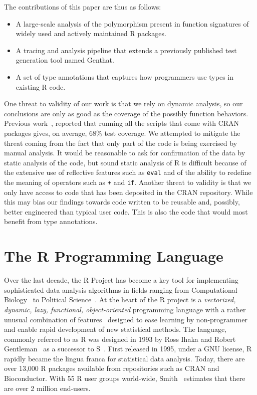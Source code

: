 \documentclass[acmsmall,10pt,review,anonymous]{acmart}\settopmatter{printfolios=true,printccs=false,printacmref=false}
\newcommand{\code}[1]{\lstinline|#1|\xspace}
\newcommand{\genthat}{{\sc Genthat}\xspace}
\begin{document}
The contributions of this paper are thus as follows:
\begin{itemize}
\item A large-scale analysis of the polymorphism present in function
  signatures of \PACKAGES widely used and actively maintained R packages.
\item A tracing and analysis pipeline that extends a previously published
  test generation tool named \genthat.
\item A set of type annotations that captures how programmers use types
in existing R code.
\end{itemize}

One threat to validity of our work is that we rely on dynamic analysis, so
our conclusions are only as good as the coverage of the possibly function
behaviors. Previous work~\cite{issta18}, reported that running all the
scripts that come with CRAN packages gives, on average, 68\% test coverage.
We attempted to mitigate the threat coming from the fact that only part of
the code is being exercised by manual analysis. It would be reasonable to
ask for confirmation of the data by static analysis of the code, but sound
static analysis of R is difficult because of the extensive use of reflective
features such as \code{eval} and of the ability to redefine the meaning of
operators such as \code{+} and \code{if}.  Another threat to validity is
that we only have access to code that has been deposited in the CRAN
repository. While this may bias our findings towards code written to be
reusable and, possibly, better engineered than typical user code. This is
also the code that would most benefit from type annotations.

\newpage  %

\section{The R Programming Language}\label{sec:rlang}

Over the last decade, the R Project has become a key tool for implementing
sophisticated data analysis algorithms in fields ranging from Computational
Biology~\cite{R05} to Political Science~\cite{R:Keele:2008}. At the heart of
the R project is a \emph{vectorized, dynamic, lazy, functional,
  object-oriented} programming language with a rather unusual combination of
features~\cite{ecoop12} designed to ease learning by non-programmer and
enable rapid development of new statistical methods.  The language, commonly
referred to as R was designed in 1993 by Ross Ihaka and Robert
Gentleman~\cite{R96} as a successor to S~\cite{S88}.  First released in
1995, under a GNU license, R rapidly became the lingua franca for
statistical data analysis. Today, there are over 13,000 R packages available
from repositories such as CRAN and Bioconductor.  With 55 R user groups
world-wide, Smith~\cite{eco11} estimates that there are over 2 million
end-users.
\end{document}
